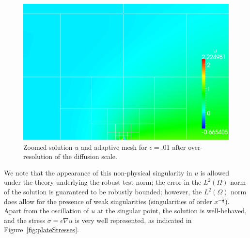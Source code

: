 \documentclass[letterpaper]{article}
\newcommand{\LRp}[1]{\left( #1 \right)}
\newcommand{\Grad} {\ensuremath{\nabla}}
\renewcommand{\L}{L^2\LRp{\Omega}}
\begin{document}
\begin{figure}[!h]
\centering
\includegraphics[scale=.375]{figs/LaplaceFigs/confusion1e2h1e3uZoom.png}
\caption{Zoomed solution $u$ and adaptive mesh for $\epsilon = .01$ after over-resolution of the diffusion scale. }
\label{fig:plateOscZoom}
\end{figure}

We note that the appearance of this non-physical singularity in $u$ is allowed
under the theory underlying the robust test norm; the error in the $\L$-norm
of the solution is guaranteed to be robustly bounded; however, the $\L$ norm
does allow for the presence of weak singularities (singularities of order
$x^{-\frac{1}{2}}$).  Apart from the oscillation of $u$ at the singular point,
the solution is well-behaved, and the stress $\sigma = \epsilon \Grad u$ is
very well represented, as indicated in Figure~\ref{fig:plateStresses}.  
\end{document}
